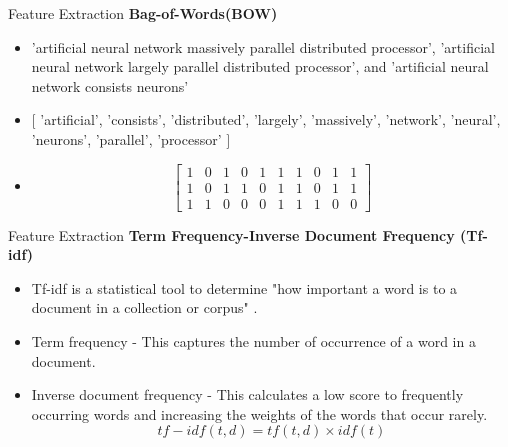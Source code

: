 \documentclass{beamer}
\begin{document}
\begin{frame}{Feature Extraction}
	\textbf{Bag-of-Words(BOW)}
	\begin{itemize}
		\item ’artificial neural network massively parallel distributed processor’, ’artificial neural network largely parallel distributed processor’, and ’artificial neural network consists neurons'
		\item $\lbrack$ ’artificial’, ’consists’, ’distributed’, ’largely’, ’massively’, ’network’, ’neural’, ’neurons’, ’parallel’, ’processor’ $\rbrack$
		\item 
		    {\footnotesize  $$ \begin{bmatrix}
		    	1 & 0 & 1 & 0 & 1 & 1 & 1 & 0 & 1 & 1 \\
		    	1 & 0 & 1 & 1 & 0 & 1 & 1 & 0 & 1 & 1 \\
		    	1 & 1 & 0 & 0 & 0 & 1 & 1 & 1 & 0 & 0
		    	\end{bmatrix}  $$}   
	\end{itemize}
\end{frame}

\begin{frame}{Feature Extraction}
	\textbf{Term Frequency-Inverse Document Frequency (Tf-idf)}
	\begin{itemize}
		\item Tf-idf is a statistical tool to determine "how important a word is to a document in a collection or corpus" \cite{tf_idf_defi}.
		\item Term frequency - This captures the number of occurrence of a word in a document.
		\item Inverse document frequency - This calculates a low score to frequently occurring words and increasing the weights of the words that occur rarely.
	\begin{equation} tf-idf(t,d) = tf(t,d) \times idf(t) \end{equation} 
	\end{itemize}
\end{frame}
\end{document}

